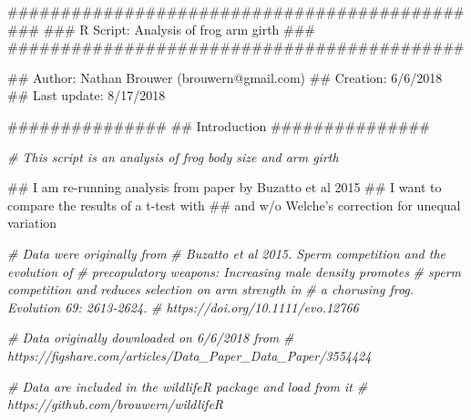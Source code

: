 \documentclass[]{book}
\newenvironment{Shaded}{\begin{snugshade}}{\end{snugshade}}
\newcommand{\KeywordTok}[1]{\textcolor[rgb]{0.13,0.29,0.53}{\textbf{#1}}}
\newcommand{\StringTok}[1]{\textcolor[rgb]{0.31,0.60,0.02}{#1}}
\newcommand{\CommentTok}[1]{\textcolor[rgb]{0.56,0.35,0.01}{\textit{#1}}}
\newcommand{\OperatorTok}[1]{\textcolor[rgb]{0.81,0.36,0.00}{\textbf{#1}}}
\newcommand{\NormalTok}[1]{#1}
\theoremstyle{definition}
\theoremstyle{definition}
\theoremstyle{definition}
\theoremstyle{remark}
\begin{document}
\begin{Shaded}
\begin{Highlighting}[]
\NormalTok{###########################################}
\NormalTok{###}
\NormalTok{### R Script: Analysis of frog arm girth}
\NormalTok{###}
\NormalTok{###########################################}

\NormalTok{## Author:      Nathan Brouwer (brouwern@gmail.com)}
\NormalTok{## Creation:    6/6/2018}
\NormalTok{## Last update: 8/17/2018}


\NormalTok{###############}
\NormalTok{## Introduction}
\NormalTok{###############}

\CommentTok{# This script is an analysis of frog body size and arm girth}

\NormalTok{## I am re-running analysis from paper by Buzatto  et al 2015}
\NormalTok{## I want to compare the results of a t-test with}
\NormalTok{## and w/o Welche's correction for unequal variation}
\end{Highlighting}
\end{Shaded}

\begin{Shaded}
\begin{Highlighting}[]
\CommentTok{# Data were originally from }
\CommentTok{# Buzatto  et al 2015. Sperm competition and the evolution of }
\CommentTok{#       precopulatory weapons: Increasing male density promotes}
\CommentTok{#       sperm competition and reduces selection on arm strength in}
\CommentTok{#       a chorusing frog. Evolution 69: 2613-2624. }
\CommentTok{#       https://doi.org/10.1111/evo.12766}

\CommentTok{# Data originally downloaded on  6/6/2018 from}
\CommentTok{#   https://figshare.com/articles/Data_Paper_Data_Paper/3554424}

\CommentTok{# Data are included in the wildlifeR package and load from it}
\CommentTok{#     https://github.com/brouwern/wildlifeR}
\end{Highlighting}
\end{Shaded}

\begin{Shaded}
\end{Shaded}
\end{document}
